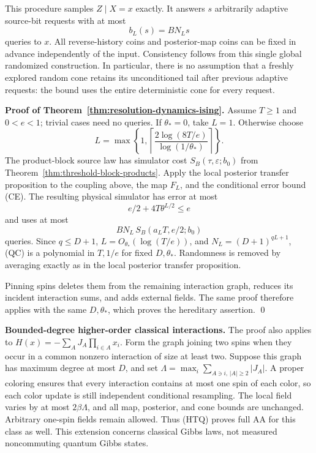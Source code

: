 This procedure samples \(Z\mid X=x\) exactly. It answers \(s\)
arbitrarily adaptive source-bit requests with at most
\[
 b_L(s)=BN_Ls
\]
queries to \(x\). All reverse-history coins and posterior-map coins
can be fixed in advance independently of the input. Consistency follows
from this single global randomized construction. In particular, there
is no assumption that a freshly explored random cone retains its
unconditioned tail after previous adaptive requests: the bound uses
the entire deterministic cone for every request.

\textbf{Proof of Theorem~\ref{thm:resolution-dynamics-ising}.}
Assume \(T\ge1\) and \(0<e<1\); trivial cases need no queries.
If \(\theta_*=0\), take \(L=1\). Otherwise choose
\[
 L=\max\left\{1,
 \left\lceil\frac{2\log(8T/e)}{\log(1/\theta_*)}\right\rceil
 \right\}.
\]
The product-block source law has simulator cost
\(S_B(\tau,\varepsilon;b_0)\) from
Theorem~\ref{thm:threshold-block-products}. Apply the local posterior
transfer proposition to the coupling above, the map \(F_L\), and
the conditional error bound (CE). The resulting physical simulator
has error at most
\[
 e/2+4T\theta^{L/2}\le e
\]
and uses at most
\[
 B N_L\,S_B(a_LT,e/2;b_0)
 \tag{QC}
\]
queries. Since \(q\le D+1\), \(L=O_{\theta_*}(\log(T/e))\),
and \(N_L=(D+1)^{qL+1}\), (QC) is a polynomial in \(T,1/e\)
for fixed \(D,\theta_*\). Randomness is removed by averaging exactly
as in the local posterior transfer proposition.

Pinning spins deletes them from the remaining interaction graph,
reduces its incident interaction sums, and adds external fields.
The same proof therefore applies with the same \(D,\theta_*\),
which proves the hereditary assertion. \qed

\textbf{Bounded-degree higher-order classical interactions.}
The proof also applies to
\(H(x)=-\sum_A J_A\prod_{i\in A}x_i\). Form the graph joining two
spins when they occur in a common nonzero interaction of size at least
two. Suppose this graph has maximum degree at most \(D\), and set
\(\Lambda=\max_i\sum_{A\ni i,\,|A|\ge2}|J_A|\).
A proper coloring ensures that every interaction contains at most one
spin of each color, so each color update is still independent
conditional resampling. The local field varies by at most
\(2\beta\Lambda\), and all map, posterior, and cone bounds are
unchanged. Arbitrary one-spin fields remain allowed. Thus (HTQ)
proves full AA for this class as well. This extension concerns
classical Gibbs laws, not measured noncommuting quantum Gibbs states.
